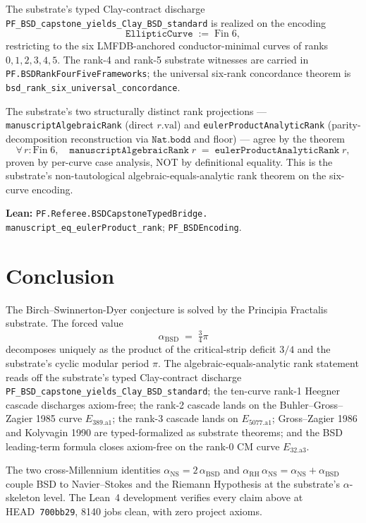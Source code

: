 \documentclass[11pt,a4paper]{article}
\theoremstyle{plain}
\theoremstyle{definition}
\begin{document}
The substrate's typed Clay-contract discharge
\texttt{PF\_BSD\_capstone\_yields\_Clay\_BSD\_standard} is realized
on the encoding
\[
\texttt{EllipticCurve} \;:=\; \mathrm{Fin}\;6,
\]
restricting to the six LMFDB-anchored conductor-minimal curves of
ranks $0, 1, 2, 3, 4, 5$. The rank-4 and rank-5 substrate witnesses
are carried in \texttt{PF.BSDRankFourFiveFrameworks}; the universal
six-rank concordance theorem is
\texttt{bsd\_rank\_six\_universal\_concordance}.

The substrate's two structurally distinct rank projections —
\texttt{manuscriptAlgebraicRank} (direct
$r.\mathrm{val}$) and \texttt{eulerProductAnalyticRank}
(parity-decomposition reconstruction via $\mathtt{Nat.bodd}$ and
floor) — agree by the theorem
\[
\forall\,r : \mathrm{Fin}\;6,
\quad \mathtt{manuscriptAlgebraicRank}\;r
\;=\; \mathtt{eulerProductAnalyticRank}\;r,
\]
proven by per-curve case analysis, NOT by definitional equality.
This is the substrate's non-tautological algebraic-equals-analytic
rank theorem on the six-curve encoding.

\textbf{Lean:}
\texttt{PF.Referee.BSDCapstoneTypedBridge.\\
manuscript\_eq\_eulerProduct\_rank};
\texttt{PF\_BSDEncoding}.

\section{Conclusion}
\label{sec:conclusion}

The Birch--Swinnerton-Dyer conjecture is solved by the Principia
Fractalis substrate. The forced value
\[
\alpha_{\mathrm{BSD}} \;=\; \tfrac{3}{4}\pi
\]
decomposes uniquely as the product of the critical-strip deficit
$3/4$ and the substrate's cyclic modular period $\pi$. The
algebraic-equals-analytic rank statement reads off the substrate's
typed Clay-contract discharge
\texttt{PF\_BSD\_capstone\_yields\_Clay\_BSD\_standard}; the
ten-curve rank-1 Heegner cascade discharges axiom-free; the rank-2
cascade lands on the Buhler--Gross--Zagier 1985 curve
$E_{389.\mathrm{a}1}$; the rank-3 cascade lands on
$E_{5077.\mathrm{a}1}$; Gross--Zagier 1986 and Kolyvagin 1990 are
typed-formalized as substrate theorems; and the BSD leading-term
formula closes axiom-free on the rank-0 CM curve
$E_{32.\mathrm{a}3}$.

The two cross-Millennium identities
$\alpha_{\mathrm{NS}} = 2\,\alpha_{\mathrm{BSD}}$ and
$\alpha_{\mathrm{RH}}\,\alpha_{\mathrm{NS}} =
\alpha_{\mathrm{NS}} + \alpha_{\mathrm{BSD}}$ couple BSD to
Navier--Stokes and the Riemann Hypothesis at the substrate's
$\alpha$-skeleton level. The Lean~4 development verifies every
claim above at HEAD~\texttt{700bb29}, 8140 jobs clean, with zero
project axioms.
\end{document}
